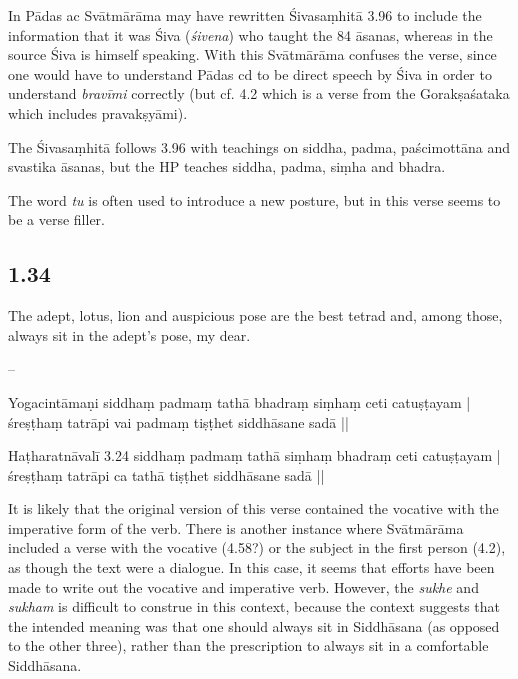 \begin{ekdosis}
\begin{philcomm}[hp01_033]
In Pādas ac Svātmārāma may have rewritten Śivasaṃhitā 3.96 to include the information that it was Śiva (\emph{śivena}) who taught the 84 āsanas, whereas in the source Śiva is himself speaking. With this
Svātmārāma confuses the verse, since one would have to understand Pādas cd to be direct speech by Śiva in order to understand \emph{bravīmi} correctly (but cf. 4.2 which is a verse from the Gorakṣaśataka which includes pravakṣyāmi).

The Śivasaṃhitā follows 3.96 with teachings on siddha, padma, paścimottāna and svastika āsanas, but the HP teaches siddha, padma, siṃha and bhadra.

The word \emph{tu} is often used to introduce a new posture, but in this verse seems to be a verse filler.
\end{philcomm}

\subsection*{1.34}
\begin{translation}[hp01_034]
The adept, lotus, lion and auspicious pose are the best tetrad and, among those, always sit in the adept’s pose, my dear.
\end{translation}

\begin{sources}[hp01_034]
--
\end{sources}

\begin{testimonia}[hp01_034]
Yogacintāmaṇi
\startverse
siddhaṃ padmaṃ tathā bhadraṃ siṃhaṃ ceti catuṣṭayam |\\
śreṣṭhaṃ tatrāpi vai padmaṃ tiṣṭhet siddhāsane sadā ||
\endverse

Haṭharatnāvalī 3.24
\startverse
siddhaṃ padmaṃ tathā siṃhaṃ bhadraṃ ceti catuṣṭayam |\\
śreṣṭhaṃ tatrāpi ca tathā tiṣṭhet siddhāsane sadā ||
\endverse
\end{testimonia}

\begin{philcomm}[hp01_034]
It is likely that the original version of this verse contained the vocative with the imperative form of the verb. There is another instance where Svātmārāma included a verse with the vocative (4.58?) or the subject in the first person (4.2), as though the text were a dialogue. In this case, it seems that efforts have been made to write out the vocative and imperative verb. However, the \emph{sukhe} and \emph{sukham} is difficult to construe in this context, because the context suggests that the intended meaning was that one should always sit in Siddhāsana (as opposed to the other three), rather than the prescription to always sit in a comfortable Siddhāsana.   
\end{philcomm}


\end{ekdosis}
